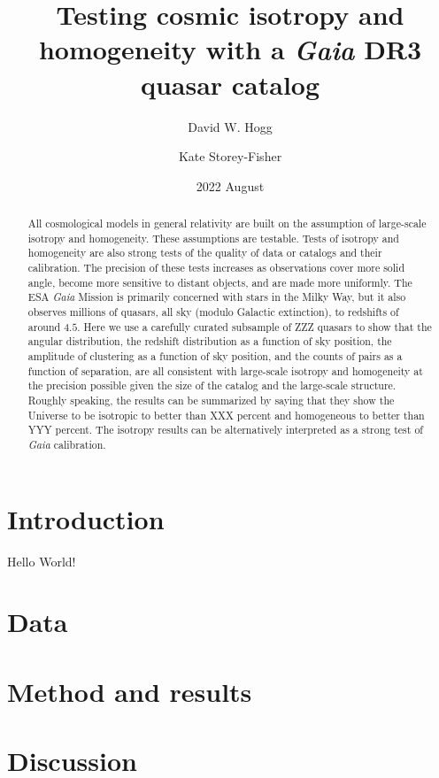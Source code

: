 \documentclass[modern]{aastex631}
\begin{document}
\title{%
Testing cosmic isotropy and homogeneity with a \textsl{Gaia} DR3 quasar catalog}
\author{David W. Hogg}

\author{Kate Storey-Fisher}

\date{2022 August}

\begin{abstract}\noindent
All cosmological models in general relativity are built on the assumption of large-scale isotropy and homogeneity.
These assumptions are testable.
Tests of isotropy and homogeneity are also strong tests of the quality of data or catalogs and their calibration.
The precision of these tests increases as observations cover more solid angle, become more sensitive to distant objects, and are made more uniformly.
The ESA \textsl{Gaia} Mission is primarily concerned with stars in the Milky Way, but it also observes millions of quasars, all sky (modulo Galactic extinction), to redshifts of around $4.5$.
Here we use a carefully curated subsample of ZZZ quasars to show that the angular distribution, the redshift distribution as a function of sky position, the amplitude of clustering as a function of sky position, and the counts of pairs as a function of separation, are all consistent with large-scale isotropy and homogeneity at the precision possible given the size of the catalog and the large-scale structure.
Roughly speaking, the results can be summarized by saying that they show the Universe to be isotropic to better than XXX percent and homogeneous to better than YYY percent.
The isotropy results can be alternatively interpreted as a strong test of \textsl{Gaia} calibration.
\end{abstract}

\section{Introduction}

Hello World!

\section{Data}

\section{Method and results}

\section{Discussion}
\end{document}
